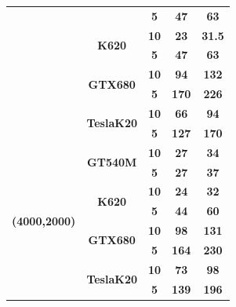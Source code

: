 \documentclass[conference]{IEEEtran}
\begin{document}
\begin{table}[h]
\begin{tabular}{@{}cc|c|cc@{}}
                                     &                                    & \textbf{5}    & \textbf{47}  & \textbf{63}   \\ \cmidrule(l){2-5} 
                                     & \multirow{2}{*}{\textbf{K620}}     & \textbf{10}   & \textbf{23}  & \textbf{31.5} \\ \cmidrule(l){3-5}
                                     &                                    & \textbf{5}    & \textbf{47}  & \textbf{63}    \\ \cmidrule(l){2-5}
                                     & \multirow{2}{*}{\textbf{GTX680}}   & \textbf{10}   & \textbf{94}  & \textbf{132}  \\ \cmidrule(l){3-5}
                                     &                                    & \textbf{5}    & \textbf{170} & \textbf{226}   \\ \cmidrule(l){2-5}
                                     & \multirow{2}{*}{\textbf{TeslaK20}} & \textbf{10}   & \textbf{66}  & \textbf{94}   \\ \cmidrule(l){3-5}
                                     &                                    & \textbf{5}    & \textbf{127} & \textbf{170}  \\ \midrule
\multirow{8}{*}{\textbf{(4000,2000)}}& \multirow{2}{*}{\textbf{GT540M}}   & \textbf{10}   & \textbf{27}  & \textbf{34}   \\ \cmidrule(l){3-5} 
                                     &                                    & \textbf{5}    & \textbf{27}  & \textbf{37}   \\ \cmidrule(l){2-5} 
                                     & \multirow{2}{*}{\textbf{K620}}     & \textbf{10}   & \textbf{24}  & \textbf{32}   \\ \cmidrule(l){3-5}
                                     &                                    & \textbf{5}    & \textbf{44}   & \textbf{60}   \\ \cmidrule(l){2-5}
                                     & \multirow{2}{*}{\textbf{GTX680}}   & \textbf{10}   & \textbf{98}  & \textbf{131}  \\ \cmidrule(l){3-5}
                                     &                                    & \textbf{5}    & \textbf{164}  & \textbf{230}  \\ \cmidrule(l){2-5}
                                     & \multirow{2}{*}{\textbf{TeslaK20}} & \textbf{10}   & \textbf{73}  & \textbf{98}   \\ \cmidrule(l){3-5}
                                     &                                    & \textbf{5}    & \textbf{139} & \textbf{196}  \\ \bottomrule
\end{tabular}
\end{table}
\end{document}
